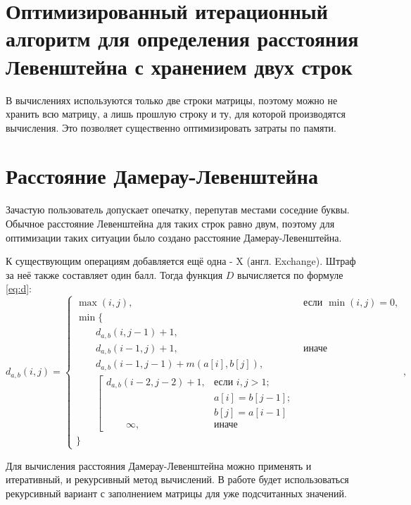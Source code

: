 \section{Оптимизированный итерационный алгоритм для определения расстояния Левенштейна с хранением двух строк}
В вычислениях используются только две строки матрицы, поэтому можно не хранить всю матрицу, а лишь прошлую строку и ту, для которой производятся вычисления. Это позволяет существенно оптимизировать затраты по памяти.

\section{Расстояние Дамерау-Левенштейна}
Зачастую пользователь допускает опечатку, перепутав местами соседние буквы. Обычное расстояние Левенштейна для таких строк равно двум, поэтому для оптимизации таких ситуации было создано расстояние Дамерау-Левенштейна\cite{ifmo}.

К существующим операциям добавляется ещё одна - X (англ. Exchange). Штраф за неё также составляет один балл. Тогда функция $D$ вычисляется по формуле \ref{eq:d}:
\begin{equation}
	\label{eq:d}
	d_{a,b}(i, j) = \begin{cases}
		\max(i, j), &\text{если }\min(i, j) = 0,\\
		\min \lbrace \\
			\qquad d_{a,b}(i, j-1) + 1,\\
			\qquad d_{a,b}(i-1, j) + 1, &\text{иначе}\\
			\qquad d_{a,b}(i-1, j-1) + m(a[i], b[j]),\\
			\qquad \left[ \begin{array}{cc}d_{a,b}(i-2, j-2) + 1, &\text{если }i,j > 1;\\
			\qquad &\text{}a[i] = b[j-1]; \\
			\qquad &\text{}b[j] = a[i-1]\\
			\qquad \infty, & \text{иначе}\end{array}\right.\\
		\rbrace
		\end{cases},
\end{equation}

Для вычисления расстояния Дамерау-Левенштейна можно применять и итеративный, и рекурсивный метод вычислений. В работе будет использоваться рекурсивный вариант с заполнением матрицы для уже подсчитанных значений.


